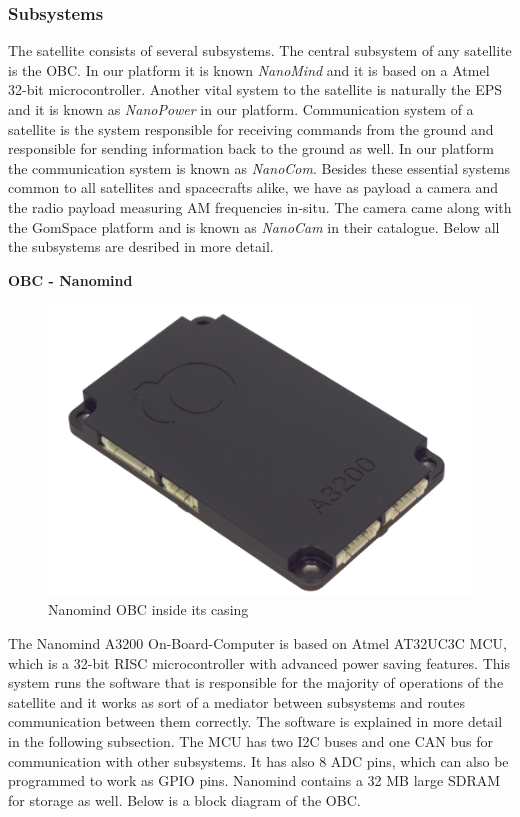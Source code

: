 \documentclass[english,12pt,a4paper,pdftex,elec,utf8]{aaltothesis}
\begin{document}
\subsubsection{Subsystems}
The satellite consists of several subsystems. The central subsystem of any satellite is the OBC. In our platform it is known \textit{NanoMind} and it is based on a Atmel 32-bit microcontroller. Another vital system to the satellite is naturally the EPS and it is known as \textit{NanoPower} in our platform. Communication system of a satellite is the system responsible for receiving commands from the ground and responsible for sending information back to the ground as well. In our platform the communication system is known as \textit{NanoCom}. Besides these essential systems common to all satellites and spacecrafts alike, we have as payload a camera and the radio payload measuring AM frequencies in-situ. The camera came along with the GomSpace platform and is known as \textit{NanoCam} in their catalogue. Below all the subsystems are desribed in more detail. \par 
\bigskip
\textbf{OBC - Nanomind}
\begin{figure}[h!]
\caption{Nanomind OBC inside its casing}
\includegraphics[scale=0.2]{nanomind}
\end{figure}\par
The Nanomind A3200 On-Board-Computer is based on Atmel AT32UC3C MCU, which is a 32-bit RISC microcontroller with advanced power saving features. This system runs the software that is responsible for the majority of operations of the satellite and it works as sort of a mediator between subsystems and routes communication between them correctly. The software is explained in more detail in the following subsection. The MCU has two I2C buses and one CAN bus for communication with other subsystems. It has also 8 ADC pins, which can also be programmed to work as GPIO pins. Nanomind contains a 32 MB large SDRAM for storage as well. Below is a block diagram of the OBC.
\end{document}
